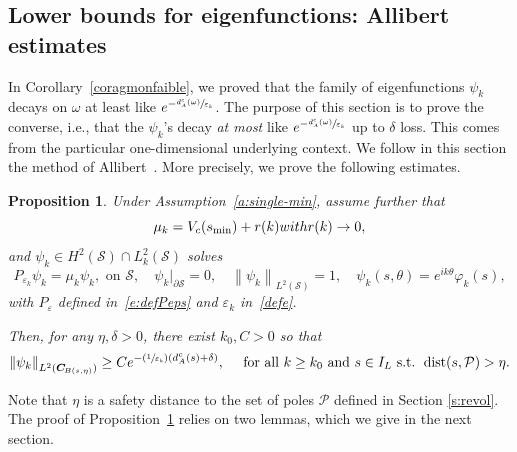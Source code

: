\documentclass[11pt]{article}
\newcommand{\ie}{i.e.,\xspace}
\numberwithin{equation}{section}
\newcommand{\Psfrac}[2]{(\sfrac{#1}{#2})}
\newtheorem{proposition}[lemma]{Proposition}
\theoremstyle{definition}
\renewcommand{\P}{\ensuremath{\mathcal P}}
\newcommand{\calS}{\ensuremath{\mathcal S}}
\DeclareMathOperator{\dist}{dist}
\newcommand\nor[2]{\left\|#1\right\|_{#2}}
\newcommand{\ce}{c}
\let\d\partial
\let\e\varepsilon
\let\eps\varepsilon
\newcommand\CO[1]{\boldsymbol{C}_{\!#1}}
\begin{document}
\subsection{Lower bounds for eigenfunctions: Allibert estimates}
\label{sectlower}
In Corollary~\ref{coragmonfaible}, we proved that the family of eigenfunctions $\psi_k$ decays on $\omega$ at least like $e^{-\sfrac{d_A^{\ce}(\omega)}{\eps_k}}$.
The purpose of this section is to prove the converse, \ie that the $\psi_k$'s decay {\em at most} like $e^{-\sfrac{d_A^{\ce}(\omega)}{\eps_k}}$ up to $\delta$ loss.
This comes from the particular one-dimensional underlying context.
We follow in this section the method of Allibert~\cite{Allibert:98}.
More precisely, we prove the following estimates.
\begin{proposition}
\label{propinfdA}
Under Assumption~\ref{a:single-min}, assume further that
\begin{equation}
\label{rappelmuinf}\mu_k = V_\ce(s_{\min}) +r(k)\textnormal{ with }r(k)\to 0,
\end{equation}
and $\psi_k \in H^2 (\mathcal{S})\cap L^2_k(\calS)$ solves
\[
P_{\e_k}\psi_k=\mu_k \psi_k, \text{ on } \calS, \quad \psi_k|_{\d\calS} = 0,\quad \nor{\psi_k}{L^2(\calS)}=1, \quad \psi_k(s, \theta) = e^{ik \theta}\varphi_k(s),
\]
with $P_\eps$ defined in~\eqref{e:defPeps} and $\e_k$ in~\eqref{defe}.

Then, for any $\eta,\delta>0$, there exist $k_0,C>0$ so that
\[
\nor{\psi_k}{L^2(\CO{B(s,\eta)})}\geq C e^{-\Psfrac{1}{\e_k}(d_A^{\ce}(s)+\delta)}, \quad \text{ for all } k\geq k_0\text{ and }s \in I_L \text{ s.t. }\dist(s,\mathcal{P} )>\eta.
\]
\end{proposition}
Note that $\eta$ is a safety distance to the set of poles $\P$ defined in Section \ref{s:revol}.
The proof of Proposition~\ref{propinfdA} relies on two lemmas, which we give in the next section.
\end{document}
